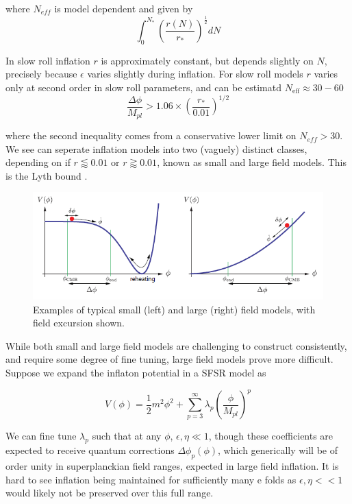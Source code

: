 \documentclass[a4paper,10pt]{article}
\newcommand{\Mp}{M_{pl}}
\newcommand{\half}{\frac{1}{2}}
\begin{document}
where $N_{eff}$ is model dependent and given by
\begin{equation}
\int_0^{N_*}\left(\frac{r(N)}{r_*}\right)^\half dN
\end{equation}


In slow roll inflation $r$ is approximately constant, but depends slightly on $N$, precisely because $\epsilon$ varies slightly during inflation. For slow roll models $r$ varies only at second order in slow roll parameters, and can be estimatd $N_{\text{eff}} \approx 30-60$
\begin{equation}
\frac{\Delta \phi}{\Mp} > 1.06 \times (\frac{r_*}{0.01})^{1/2}
\end{equation}

where the second inequality comes from a conservative lower limit on $N_{eff} > 30$. We see can seperate inflation models into two (vaguely) distinct classes, depending on if $r\lessapprox 0.01$ or $r\gtrapprox 0.01$, known as small and large field models. This is the Lyth bound \cite{Lyth}. \\


\begin{figure}[h]
  \includegraphics[width=\linewidth]{smalllargefield.png}
  \caption{Examples of typical small (left) and large (right) field models, with field excursion shown.}
\end{figure}

While both small and large field models are challenging to construct consistently, and require some degree of fine tuning, large field models prove more difficult. Suppose we expand the inflaton potential in a SFSR model as 

\begin{equation}
V(\phi) = \half m^2\phi^2 + \sum_{p=3}^\infty \lambda_p(\frac{\phi}{\Mp})^p
\end{equation}

We can fine tune $\lambda_p$ such that at any $\phi$, $\epsilon, \eta \ll 1$, though these coefficients are expected to receive quantum corrections $\Delta\phi_p(\phi)$, which generically will be of order unity in superplanckian field ranges, expected in large field inflation. It is hard to see inflation being maintained for sufficiently many e folds as $\epsilon, \eta << 1$ would likely not be preserved over this full range. \\
\end{document}
